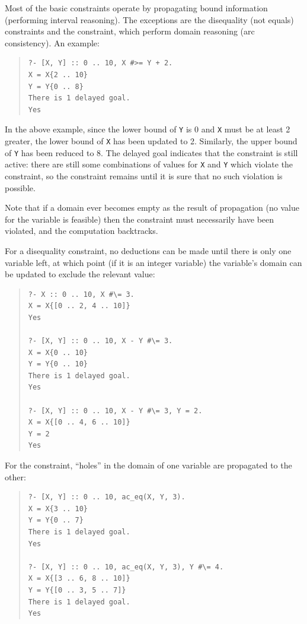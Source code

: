 Most of the basic constraints operate by propagating bound information
(performing interval reasoning).  The exceptions are the disequality (not
equals) constraints and the  constraint, which perform
domain reasoning (arc consistency).  An example:

\begin{quote}\begin{verbatim}
?- [X, Y] :: 0 .. 10, X #>= Y + 2.
X = X{2 .. 10}
Y = Y{0 .. 8}
There is 1 delayed goal.
Yes
\end{verbatim}\end{quote}

In the above example, since the lower bound of \texttt{Y} is 0 and
\texttt{X} must be at least 2 greater, the lower bound of \texttt{X} has
been updated to 2.  Similarly, the upper bound of \texttt{Y} has been
reduced to 8.  The delayed goal indicates that the constraint is still
active: there are still some combinations of values for \texttt{X} and
\texttt{Y} which violate the constraint, so the constraint remains until it
is sure that no such violation is possible.

Note that if a domain ever becomes empty as the result of propagation (no
value for the variable is feasible) then the constraint must necessarily
have been violated, and the computation backtracks.

For a disequality constraint, no deductions can be made until
there is only one variable left, at which point (if it is an integer
variable) the variable's domain can be updated to exclude the relevant
value:

\begin{quote}\begin{verbatim}
?- X :: 0 .. 10, X #\= 3.
X = X{[0 .. 2, 4 .. 10]}
Yes

?- [X, Y] :: 0 .. 10, X - Y #\= 3.
X = X{0 .. 10}
Y = Y{0 .. 10}
There is 1 delayed goal.
Yes

?- [X, Y] :: 0 .. 10, X - Y #\= 3, Y = 2.
X = X{[0 .. 4, 6 .. 10]}
Y = 2
Yes
\end{verbatim}\end{quote}

For the  constraint, ``holes''
in the domain of one variable are propagated to the other:

\begin{quote}\begin{verbatim}
?- [X, Y] :: 0 .. 10, ac_eq(X, Y, 3).
X = X{3 .. 10}
Y = Y{0 .. 7}
There is 1 delayed goal.
Yes

?- [X, Y] :: 0 .. 10, ac_eq(X, Y, 3), Y #\= 4.
X = X{[3 .. 6, 8 .. 10]}
Y = Y{[0 .. 3, 5 .. 7]}
There is 1 delayed goal.
Yes
\end{verbatim}\end{quote}


